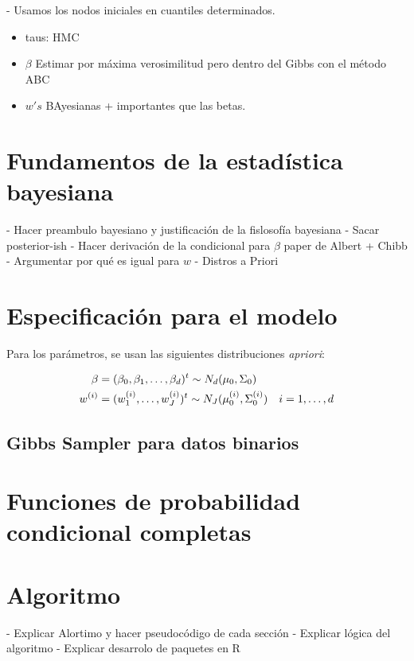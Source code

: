 \documentclass[../Main/Main.tex]{subfiles}
\begin{document}
- Usamos los nodos iniciales en cuantiles determinados.\\
\begin{itemize}
\item taus: HMC
\item $\beta$ Estimar por máxima verosimilitud pero dentro del Gibbs con el método ABC
\item $w's$ BAyesianas + importantes que las betas.
\end{itemize}


\section{Fundamentos de la estadística bayesiana}

- Hacer preambulo bayesiano y justificación de la fislosofía bayesiana
- Sacar posterior-ish
- Hacer derivación de la condicional para $\beta$ paper de Albert + Chibb
- Argumentar por qué es igual para $w$
- Distros a Priori

\section{Especificación para el modelo}
Para los parámetros, se usan las siguientes distribuciones \textit{apriori}:

\begin{align}
	\mathbf{\beta} &= (\beta_0,\beta_1,\ldots,\beta_d)^t \sim N_d(\mu_0, \Sigma_0) \\
	w^{(i)} &= (w^{(i)}_1,\ldots,w^{(i)}_J)^t \sim N_J(\mu^{(i)}_0,\Sigma^{(i)}_0) \quad i=1,\ldots,d
\end{align}

\subsection{Gibbs Sampler para datos binarios}

\section{Funciones de probabilidad condicional completas}


\section{Algoritmo}

- Explicar Alortimo y hacer pseudocódigo de cada sección
- Explicar lógica del algoritmo
- Explicar desarrolo de paquetes en R
\end{document}
